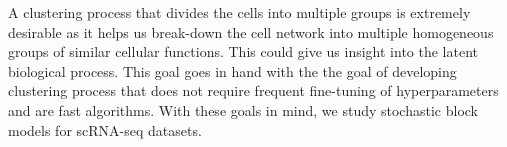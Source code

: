 \documentclass[11pt]{article}
\begin{document}
A clustering process that divides the cells into multiple groups is extremely desirable as it helps us break-down the cell network into multiple homogeneous groups of similar cellular functions. This could give us insight into the latent biological process. This goal goes in hand with the the goal of developing clustering process that does not require frequent fine-tuning of hyperparameters and are fast algorithms. With these goals in mind, we study stochastic block models for scRNA-seq datasets.

\end{document}
